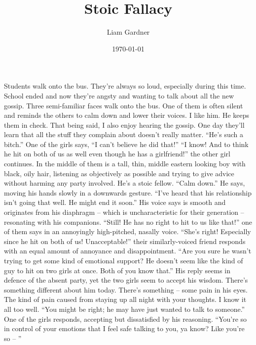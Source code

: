 \documentclass[a4paper, 12pt]{book}
\title{Stoic Fallacy}
\author{Liam Gardner}
\date{\today}
\newcommand\tab[1][1cm]{\hspace*{#1}}
\begin{document}
\maketitle
\tab
Students walk onto the bus. They’re always so loud, especially during this time. School ended and now they’re angsty and wanting to talk about all the new gossip. Three semi-familiar faces walk onto the bus. One of them is often silent and reminds the others to calm down and lower their voices. I like him. He keeps them in check. That being said, I also enjoy hearing the gossip. One day they’ll learn that all the stuff they complain about doesn’t really matter.
\newline
\tab
``He’s such a bitch.'' One of the girls says, ``I can’t believe he did that!''
\newline
\tab
``I know! And to think he hit on both of us as well even though he has a girlfriend!'' the other girl continues.
\newline
\tab
In the middle of them is a tall, thin, middle eastern looking boy with black, oily hair, listening as objectively as possible and trying to give advice without harming any party involved. He’s a stoic fellow. ``Calm down.'' He says, moving his hands slowly in a downwards gesture. ``I’ve heard that his relationship isn’t going that well. He might end it soon.'' His voice says is smooth and originates from his diaphragm -- which is uncharacteristic for their generation -- resonating with his companions.
\newline
\tab
``Still! He has no right to hit to us like that!'' one of them says in an annoyingly high-pitched, nasally voice.
\newline
\tab
``She’s right! Especially since he hit on both of us! Unacceptable!'' their similarly-voiced friend responds with an equal amount of annoyance and disappointment.
\newline
\tab
``Are you sure he wasn’t trying to get some kind of emotional support? He doesn’t seem like the kind of guy to hit on two girls at once. Both of you know that.'' His reply seems in defence of the absent party, yet the two girls seem to accept his wisdom. There’s something different about him today. There’s something -- some pain in his eyes. The kind of pain caused from staying up all night with your thoughts. I know it all too well.
\newline
\tab
``You might be right; he may have just wanted to talk to someone.'' One of the girls responds, accepting but dissatisfied by his reasoning. ``You’re so in control of your emotions that I feel safe talking to you, ya know? Like you’re so -- ''
\end{document}
